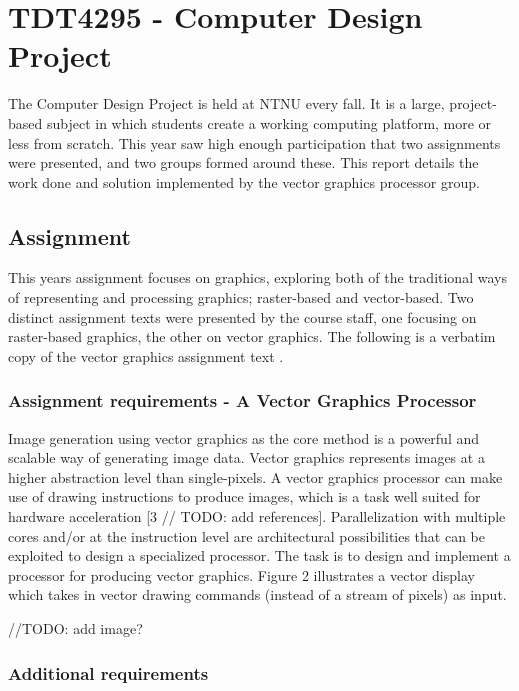 \chapter{TDT4295 - Computer Design Project}

The Computer Design Project is held at NTNU every fall.
It is a large, project-based subject in which students create a working computing platform, more or less from scratch.
This year saw high enough participation that two assignments were presented, and two groups formed around these.
This report details the work done and solution implemented by the vector graphics processor group.

\section{Assignment}

This years assignment focuses on graphics, exploring both of the traditional ways of representing and processing graphics; raster-based and vector-based.
Two distinct assignment texts were presented by the course staff, one focusing on raster-based graphics, the other on vector graphics.
The following is a verbatim copy of the vector graphics assignment text \cite{assignment-text}.

\subsection{Assignment requirements - A Vector Graphics Processor}

Image generation using vector graphics as the core method is a powerful and scalable way of generating image data.
Vector graphics represents images at a higher abstraction level than single-pixels.
A vector graphics processor can make use of drawing instructions to produce images, which is a task well suited for hardware acceleration [3 // TODO: add references].
Parallelization with multiple cores and/or at the instruction level are architectural possibilities that can be exploited to design a specialized processor.
The task is to design and implement a processor for producing vector graphics.
Figure 2 illustrates a vector display which takes in vector drawing commands (instead of a stream of pixels) as input.

//TODO: add image?

\subsection{Additional requirements}


